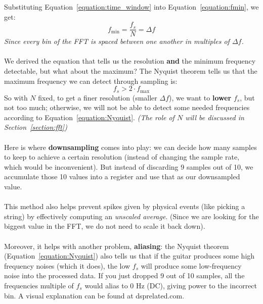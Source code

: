 Substituting Equation~\ref{equation:time_window} into Equation~\ref{equation:fmin}, we get:
\begin{equation}
    f_{\min} = \frac{f_s}{N} = \Delta f
    \label{equation:resolution}
\end{equation}
\textit{Since every bin of the FFT is spaced between one another in multiples of $\Delta f$.} 
\paragraph{}

We derived the equation that tells us the resolution \textbf{and} the minimum frequency detectable, but what about the maximum?
The Nyquist theorem tells us that the maximum frequency we can detect through sampling is:
\begin{equation}
    f_s > 2 \cdot f_{\max}
    \label{equation:Nyquist}
\end{equation}
So with $N$ fixed, to get a finer resolution (smaller $\Delta f$), we want to \textbf{lower} $f_s$, 
but not too much; otherwise, we will not be able to detect some needed frequencies according to Equation~\ref{equation:Nyquist}.
\textit{(The role of $N$ will be discussed in Section~\ref{section:fft})}

\paragraph{}

Here is where \textbf{downsampling} comes into play: we can decide how many samples to keep to achieve 
a certain resolution (instead of changing the sample rate, which would be inconvenient).
But instead of discarding 9 samples out of 10, we accumulate those 10 values into a register and use that 
as our downsampled value.
\paragraph{}
This method also helps prevent spikes given by physical events (like picking a string)
by effectively computing an \textit{unscaled average}.
(Since we are looking for the biggest value in the FFT, we do not need to scale it back down).

\paragraph{}
Moreover, it helps with another problem, \textbf{aliasing}: the Nyquist theorem (Equation~\ref{equation:Nyquist}) also 
tells us that if the guitar produces some high frequency noises (which it does), the low $f_s$ will produce some low-frequency
noise into the processed data. If you just dropped 9 out of 10 samples, all the frequencies multiple of $f_s$ would alias
to 0 Hz (DC), giving power to the incorrect bin.
A visual explanation can be found at dsprelated.com\cite{dsprelated}.
